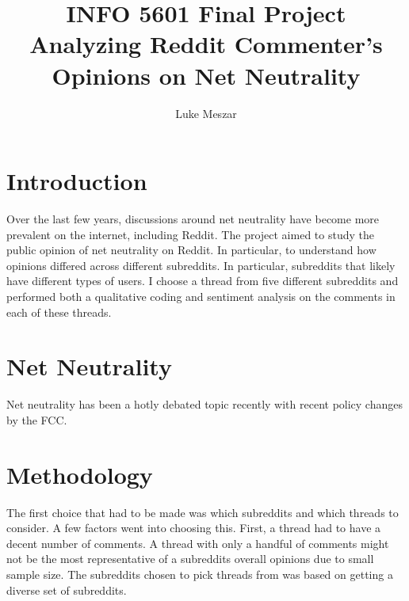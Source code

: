 \documentclass[11pt]{article}
\title{INFO 5601 Final Project \\ Analyzing Reddit Commenter's Opinions on Net Neutrality}
\author{Luke Meszar}
\date{}
\begin{document}
	\maketitle
	\section{Introduction}\label{sec:intro}
	Over the last few years, discussions around net neutrality have become more prevalent on the internet, including Reddit. The project aimed to study the public opinion of net neutrality on Reddit. In particular, to understand how opinions differed across different subreddits. In particular, subreddits that likely have different types of users. I choose a thread from five different subreddits and performed both a qualitative coding and sentiment analysis on the comments in each of these threads.
	\section{Net Neutrality}\label{sec:nn}
	Net neutrality has been a hotly debated topic recently with recent policy changes by the FCC. 
	\section{Methodology}\label{sec:method}
	The first choice that had to be made was which subreddits and which threads to consider. A few factors went into choosing this. First, a thread had to have a decent number of comments. A thread with only a handful of comments might not be the most representative of a subreddits overall opinions due to small sample size. The subreddits chosen to pick threads from was based on getting a diverse set of subreddits. 
	
\end{document}
